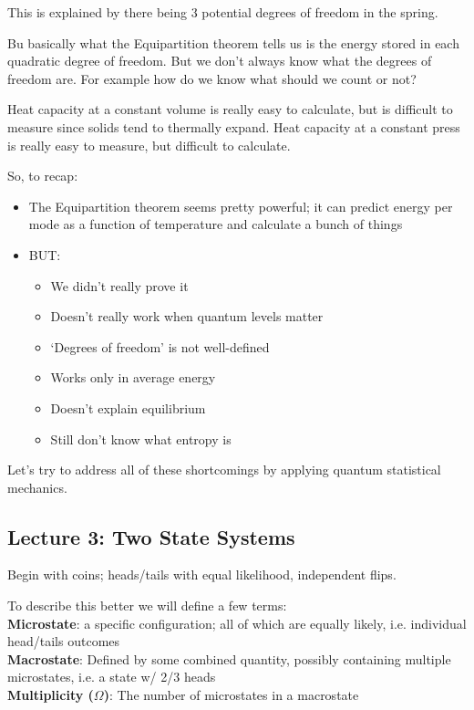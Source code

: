 \documentclass[10pt]{article}
\begin{document}
This is explained by there being $ 3 $ potential degrees of freedom in the spring\sn{\ldots}.


Bu basically what the Equipartition theorem tells us is the energy stored in each quadratic degree of freedom. 
But we don't always know what the degrees of freedom are. 
For example how do we know what should we count or not? 


\begin{remark}
	Heat capacity at a constant volume is really easy to calculate, but is difficult to measure since solids tend to thermally expand.
	Heat capacity at a constant press is really easy to measure, but difficult to calculate.
\end{remark}


So, to recap:

\begin{itemize}
	\item The Equipartition theorem seems pretty powerful; it can predict energy per mode as a function of temperature and calculate a bunch of things
	\item BUT:
			\begin{itemize}
				\item We didn't really prove it
				\item Doesn't really work when quantum levels matter
				\item `Degrees of freedom' is not well-defined
				\item Works only in average energy
				\item Doesn't explain equilibrium
				\item Still don't know what entropy is
			\end{itemize}
\end{itemize}

Let's try to address all of these shortcomings by applying quantum statistical mechanics.

\subsection{Lecture 3: Two State Systems}

Begin with coins; heads/tails with equal likelihood, independent flips.

\begin{definition}
	To describe this better we will define a few terms: \\
	\textbf{Microstate}: a specific configuration; all of which are equally likely, i.e. individual head/tails outcomes\\
	\textbf{Macrostate}: Defined by some combined quantity, possibly containing multiple microstates, i.e. a state w/ 2/3 heads\\
	\textbf{Multiplicity ($\Omega$)}: The number of microstates in a macrostate\\
\end{definition}
\end{document}
